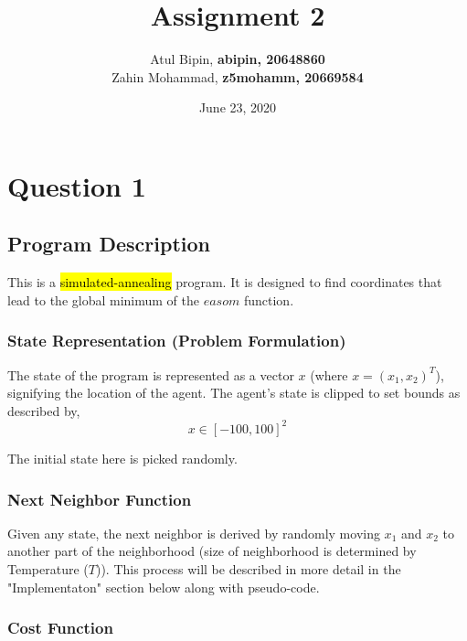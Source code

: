 \documentclass{article}
\title{Assignment 2}
\author{Atul Bipin, \textbf{abipin, 20648860}\\Zahin Mohammad, \textbf{z5mohamm, 20669584}}
\date{June 23, 2020}
\begin{document}
\maketitle



\section{Question 1}

\subsection{Program Description}

This is a \hl{simulated-annealing} program.
It is designed to find coordinates that lead to the global minimum of the $easom$ function.

\subsubsection{State Representation (Problem Formulation)}

The state of the program is represented as a vector $x$ (where $x = (x_1, x_2)^T$), signifying the location of the agent.
The agent's state is clipped to set bounds as described by,
\[x \in [-100,100]^2\]

The initial state here is picked randomly.

\subsubsection{Next Neighbor Function}

Given any state, the next neighbor is derived by randomly moving $x_1$ and $x_2$ to another part of the neighborhood (size of neighborhood is determined by Temperature ($T$)).
This process will be described in more detail in the "Implementaton" section below along with pseudo-code.

\subsubsection{Cost Function}
\end{document}
